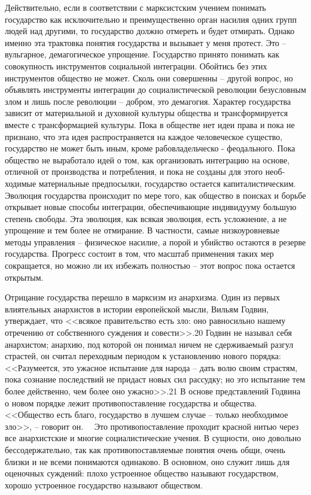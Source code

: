 \documentclass{book}
\begin{document}
Действительно, если в соответствии с марксистским учением понимать государство как исключительно и преимущественно орган насилия одних групп людей над другими, то государство должно отмереть и будет отмирать. Однако именно эта трак­товка понятия государства и вызывает у меня протест. Это -- вульгарное, демагогическое упрощение. Государство принято понимать как совокупность инструментов социальной интег­рации. Обойтись без этих инструментов общество не может. Сколь они совершенны -- другой вопрос, но объявлять инстру­менты интеграции до социалистической революции безуслов­ным злом и лишь после революции -- добром, это демагогия.
Характер государства зависит от материальной и духовной культуры общества и трансформируется вместе с трансфор­мацией культуры. Пока в обществе нет идеи права и пока не признано, что эта идея распространяется на каждое человече­ское существо, государство не может быть иным, кроме рабовладельческо - феодального. Пока общество не выработало идей о том, как организовать интеграцию на основе, отличной от производства и потребления, и пока не созданы для этого необ­ходимые материальные предпосылки, государство остается капиталистическим. Эволюция государства происходит по ме­ре того, как общество в поисках и борьбе открывает новые способы интеграции, обеспечивающие индивидууму большую степень свободы. Эта эволюция, как всякая эволюция, есть усложнение,  а не упрощение и тем более не отмирание. В част­ности, самые низкоуровневые методы управления -- физическое насилие, а порой и убийство остаются в резерве государства. Прогресс состоит в том, что масштаб применения таких мер сокращается, но можно ли их избежать 
полностью -- этот вопрос пока остается открытым.

Отрицание государства перешло в марксизм из анархизма. Один из первых влиятельных анархистов в истории европей­ской мысли, Вильям Годвин, утверждает, что <<всякое правительство есть зло: оно равносильно нашему отречению от соб­ственного суждения и совести>>.20 Годвин не называл себя анархистом; анархию, под которой он понимал ничем не сдер­живаемый разгул страстей, он считал переходным периодом к установлению нового порядка: <<Разумеется, это ужасное испытание для народа -- дать волю своим страстям, пока со­знание последствий не придаст новых сил рассудку; но это ис­пытание тем более действенно, чем более оно ужасно>>.21
В основе представлений Годвина о новом порядке лежит противопоставление государства и общества. <<Общество есть благо, государство в лучшем случае -- только необходимое зло>>, -- говорит он.   Это противопоставление проходит крас­ной нитью через все анархистские и многие социалистические учения. В сущности, оно довольно бессодержательно, так как противопоставляемые понятия очень общи, очень близки и не всеми понимаются одинаково. В основном, оно служит лишь для оценочных суждений: плохо устроенное общество называют государством, хорошо устроенное государство называют об­ществом.
\end{document}
